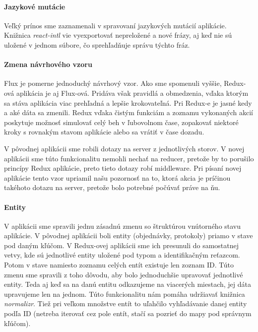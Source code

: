 \paragraph{Jazykové mutácie}
Veľký prínos sme zaznamenali v spravovaní jazykových mutácií aplikácie. Knižnica \emph{react-intl} vie vyexportovať nepreložené a nové frázy, aj keď nie sú uložené v jednom súbore, čo sprehľadňuje správu týchto fráz.

\paragraph{Zmena návrhového vzoru}
Flux je pomerne jednoduchý návrhový vzor. Ako sme spomenuli vyššie, Redux-ová aplikácia je aj Flux-ová. Pridáva však pravidlá a obmedzenia, vďaka ktorým sa stáva aplikácia viac prehľadná a lepšie krokovateľná. Pri Redux-e je jasné kedy a aké dáta sa zmenili. Redux vďaka čistým funkciám a zoznamu vykonaných akcií poskytuje možnosť simulovať celý beh v ľubovolnom čase, zopakovať niektoré kroky s rovnakým stavom aplikácie alebo sa vrátiť v čase dozadu.

V pôvodnej aplikácii sme robili dotazy na server z jednotlivých storov. V novej aplikácii sme túto funkcionalitu nemohli nechať na reducer, pretože by to porušilo princípy Redux aplikácie, preto tieto dotazy robí middleware. Pri písaní novej aplikácie tento vzor upriamil našu pozornosť na to, ktorá akcia je príčinou takéhoto dotazu na server, pretože bolo potrebné počúvať práve na ňu.%

\paragraph{Entity}
V aplikácii sme spravili jednu zásadnú zmenu so štruktúrou vnútorného stavu aplikácie. V pôvodnej aplikácii boli entity (objednávky, protokoly) priamo v stave pod daným kľúčom. 
V Redux-ovej aplikácii sme ich presunuli do samostatnej vetvy, kde sú jednotlivé entity uložené pod typom a identifikačným reťazcom. Potom v stave namiesto zoznamu celých entít existuje len zoznam ID. 
Túto zmenu sme spravili z toho dôvodu, aby bolo jednoduchšie upravovať jednotlivé entity. Teda aj keď sa na danú entitu odkazujeme na viacerých miestach, jej dáta upravujeme len na jednom. Túto funkcionalitu nám pomáha udržiavať knižnica \emph{normalizr}.
Tiež pri veľkom množstve entít to uľahčilo vyhľadávanie danej entity podľa ID (netreba iterovať cez pole entít, stačí sa pozrieť do mapy pod správnym kľúčom).

